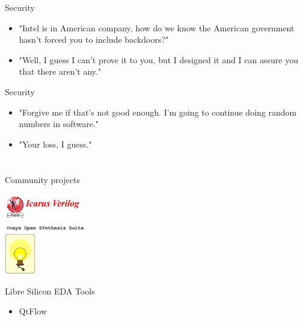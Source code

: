 \documentclass[9pt]{beamer}
\begin{document}
\begin{frame}{Security}
	\begin{itemize}
        \setlength\itemsep{1em}
        \item "Intel is in American company, how do we know the American government hasn't forced you to include backdoors?"
        \item "Well, I guess I can't prove it to you, but I designed it and I can assure you that there aren't any."
	\end{itemize}    
\end{frame}

\begin{frame}{Security}
	\begin{itemize}
        \setlength\itemsep{1em}
        \item "Forgive me if that's not good enough. I'm going to continue doing random numbers in software."
        \item "Your loss, I guess."
	\end{itemize}    
\end{frame}

\section[Who]{}
\begin{frame}{Community projects}
	\begin{center}
		\includegraphics[width=100pt]{Icarus.png} \\
		\includegraphics[width=100pt]{Yosys.png} \\
		\includegraphics[height=50pt]{Opencircuit.png}
	\end{center}
\end{frame}

\begin{frame}{Libre Silicon EDA Tools}
	\begin{itemize}
        \item QtFlow
	\end{itemize}    
\end{frame}
\end{document}

